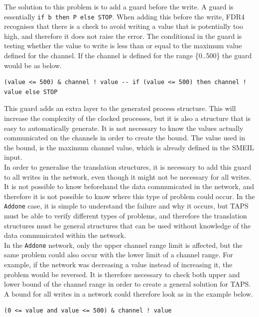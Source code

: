 The solution to this problem is to add a guard before the write. A \cspm{} guard is essentially \texttt{if b then P else STOP}. When adding this before the write, FDR4 recognises that there is a check to avoid writing a value that is potentially too high, and therefore it does not raise the error. The conditional in the guard is testing whether the value to write is less than or equal to the maximum value defined for the channel. If the channel is defined for the range \{0..500\} the guard would be as below.
\begin{verbatim}
(value <= 500) & channel ! value -- if (value <= 500) then channel ! value else STOP
\end{verbatim}

This guard adds an extra layer to the generated process structure. This will increase the complexity of the clocked processes, but it is also a structure that is easy to automatically generate. It is not necessary to know the values actually communicated on the channels in order to create the bound. The value used in the bound, is the maximum channel value, which is already defined in the SMEIL input. \\

In order to generalise the translation structures, it is necessary to add this guard to all writes in the network, even though it might not be necessary for all writes. It is not possible to know beforehand the data communicated in the network, and therefore it is not possible to know where this type of problem could occur. In the \texttt{Addone} case, it is simple to understand the failure and why it occurs, but TAPS must be able to verify different types of problems, and therefore the translation structures must be general structures that can be used without knowledge of the data communicated within the network. \\

In the \texttt{Addone} network, only the upper channel range limit is affected, but the same problem could also occur with the lower limit of a channel range. For example, if the network was decreasing a value instead of increasing it, the problem would be reversed. It is therefore necessary to check both upper and lower bound of the channel range in order to create a general solution for TAPS. A bound for all writes in a network could therefore look as in the example below.
\begin{verbatim}
(0 <= value and value <= 500) & channel ! value
\end{verbatim}
